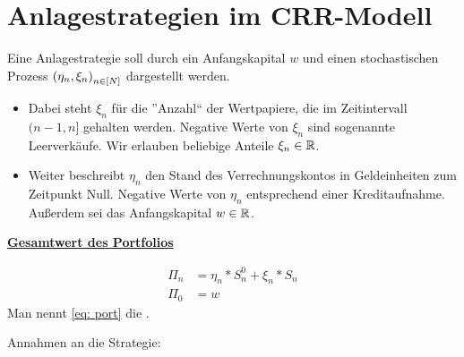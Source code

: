 \section{Anlagestrategien im CRR-Modell}

Eine Anlagestrategie soll durch ein Anfangskapital $w$ und einen stochastischen Prozess $\left( \eta_n, \xi_n \right)_{n \in [N]}$ dargestellt werden. 
\begin{itemize}
	\item Dabei steht $\xi_n$ für die ''Anzahl`` der Wertpapiere, die im Zeitintervall $(n-1,n]$ gehalten werden. Negative Werte von $\xi_n$ sind sogenannte Leerverkäufe. Wir erlauben beliebige Anteile $\xi_n \in \mathbb{R}$.
	\item Weiter beschreibt $\eta_n$ den Stand des Verrechnungskontos in Geldeinheiten zum Zeitpunkt Null. Negative Werte von $\eta_n$ entsprechend einer Kreditaufnahme.
	Außerdem sei das Anfangskapital $w \in \mathbb{R}$.
\end{itemize}

\textbf{\underline{Gesamtwert des Portfolios}}

\begin{equation*}
\begin{aligned}
\Pi_n &= \eta_n * S_n^0 + \xi_n * S_n \\
\Pi_0 &= w
\end{aligned} \tag{Port} \label{eq: port}
\end{equation*}
Man nennt \eqref{eq: port} die .

Annahmen an die Strategie:
%	
%	
%	
%	
%		
